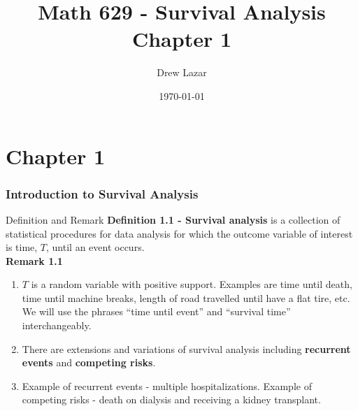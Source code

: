 \documentclass{beamer}
\title{Math 629 - Survival Analysis \\ Chapter 1}
\author{Drew Lazar}
\institute{Ball State University}
\date{\today}
\theoremstyle{definition}
\begin{document}
\begin{frame}
    \titlepage
\end{frame}
\section{Chapter 1}
\begin{frame}
\frametitle{Introduction to Survival Analysis}
\begin{block}{Definition and Remark}
\textbf{Definition 1.1 - Survival analysis} is a collection of statistical procedures for data analysis for which the outcome variable of interest is time, $T$, until an event occurs.
\\
\textbf{Remark 1.1}
\begin{enumerate}
\item $T$ is a random variable with positive support. Examples are time until death, time until machine breaks, length of road travelled until have a flat tire, etc. We will use the phrases ``time until event'' and ``survival time'' interchangeably.
\item There are extensions and variations of survival analysis including \textbf{recurrent events} and \textbf{competing risks}.
\item Example of recurrent events - multiple hospitalizations. Example of competing risks - death on dialysis and receiving a kidney transplant.
\end{enumerate}
\end{block}
\end{frame}
\end{document}
